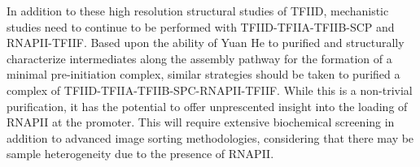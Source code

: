 \indent In addition to these high resolution structural studies of TFIID, mechanistic studies need to continue to be performed with TFIID-TFIIA-TFIIB-SCP and RNAPII-TFIIF. Based upon the ability of Yuan He to purified and structurally characterize intermediates along the assembly pathway for the formation of a minimal pre-initiation complex, similar strategies should be taken to purified a complex of TFIID-TFIIA-TFIIB-SPC-RNAPII-TFIIF. While this is a non-trivial purification, it has the potential to offer unprescented insight into the loading of RNAPII at the promoter. This will require extensive biochemical screening in addition to advanced image sorting methodologies, considering that there may be sample heterogeneity due to the presence of RNAPII.\\
